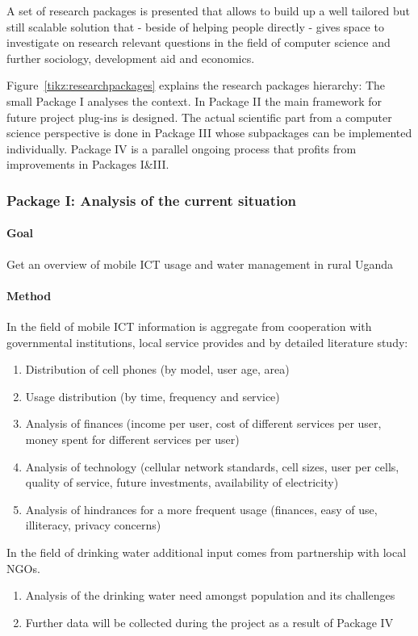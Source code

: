 \documentclass[11pt]{article}
\begin{document}
A set of research packages is presented that allows to build up a well tailored but still scalable solution that - beside of helping people directly -  gives space to investigate on research relevant questions in the field of computer science and further sociology, development aid and economics. 

Figure~\ref{tikz:researchpackages} explains the research packages hierarchy: The small Package I analyses the context. In Package II the main framework for future project plug-ins is designed. The actual scientific part from a computer science perspective is done in Package III whose subpackages can be implemented individually. Package IV is a parallel ongoing process that profits from improvements in Packages I\&III.


\subsubsection*{Package I: Analysis of the current situation}
\paragraph{Goal} Get an overview of mobile ICT usage and water management in rural Uganda
\paragraph{Method}
In the field of mobile ICT information is aggregate from cooperation with governmental institutions, local service provides and by detailed literature study:
\begin{enumerate}
 \item Distribution of cell phones (by model, user age, area)
 \item Usage distribution (by time, frequency and service)
 \item Analysis of finances (income per user, cost of different services per user, money spent for different services per user)
 \item Analysis of technology (cellular network standards, cell sizes, user per cells, quality of service, future investments, availability of electricity)
 \item Analysis of hindrances for a more frequent usage (finances, easy of use, illiteracy, privacy concerns)
\end{enumerate}
In the field of drinking water additional input comes from partnership with local NGOs.
\begin{enumerate}
 \item Analysis of the drinking water need amongst population and its challenges
 \item Further data will be collected during the project as a result of Package IV
\end{enumerate}
\end{document}
